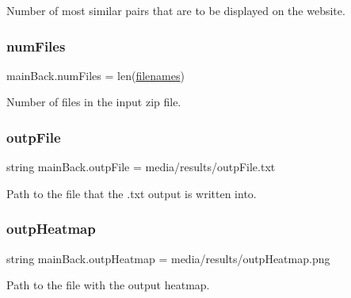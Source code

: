 Number of most similar pairs that are to be displayed on the website. 

\mbox{\label{namespacemain_back_a5a0d1ff5b5d2f3a4bec2f88ef04385b3}} 
\subsubsection{\texorpdfstring{num\+Files}{numFiles}}
{\footnotesize\ttfamily main\+Back.\+num\+Files = len(\hyperlink{namespacemain_back_ac066274638425ed709610bda61383714}{filenames})}



Number of files in the input zip file. 

\mbox{\label{namespacemain_back_ad40247629e5684702dc93dd647dfd608}} 
\subsubsection{\texorpdfstring{outp\+File}{outpFile}}
{\footnotesize\ttfamily string main\+Back.\+outp\+File = \textquotesingle{}media/results/outp\+File.\+txt\textquotesingle{}}



Path to the file that the .txt output is written into. 

\mbox{\label{namespacemain_back_abb2932e94ac86ec3fe6f83a26cd15271}} 
\subsubsection{\texorpdfstring{outp\+Heatmap}{outpHeatmap}}
{\footnotesize\ttfamily string main\+Back.\+outp\+Heatmap = \textquotesingle{}media/results/outp\+Heatmap.\+png\textquotesingle{}}



Path to the file with the output heatmap. 

\mbox{\label{namespacemain_back_ab8f29ba9b782a6e91e215a59bc597ce8}} 
